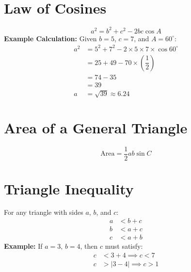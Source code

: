 \documentclass{article}
\begin{document}
\begin{multicols}{2}
\section*{Law of Cosines}
\[
a^2 = b^2 + c^2 - 2bc \cos A
\]
\textbf{Example Calculation:} Given \( b = 5 \), \( c = 7 \), and \( A = 60^\circ \):
\begin{align*}
a^2 &= 5^2 + 7^2 - 2 \times 5 \times 7 \times \cos 60^\circ \\
&= 25 + 49 - 70 \times \left( \dfrac{1}{2} \right) \\
&= 74 - 35 \\
&= 39 \\
a &= \sqrt{39} \approx 6.24
\end{align*}

\section*{Area of a General Triangle}
\[
\text{Area} = \dfrac{1}{2} ab \sin C
\]

\section*{Triangle Inequality}
For any triangle with sides \( a \), \( b \), and \( c \):
\[
\begin{aligned}
a &< b + c \\
b &< a + c \\
c &< a + b
\end{aligned}
\]
\textbf{Example:} If \( a = 3 \), \( b = 4 \), then \( c \) must satisfy:
\begin{align*}
c &< 3 + 4 \implies c < 7 \\
c &> |3 - 4| \implies c > 1
\end{align*}

\end{multicols}
\end{document}
